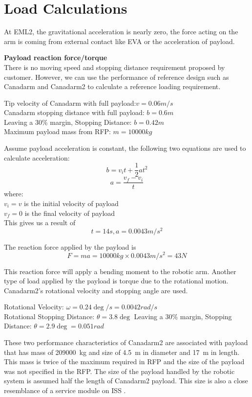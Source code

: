 \section{Load Calculations}
\label{app:loadcalc}
\setcounter{equation}{0}
At EML2, the gravitational acceleration is nearly zero, the force acting on the arm is coming from external contact like EVA or the acceleration of payload.

\large \textbf{Payload reaction force/torque}\\
\normalsize There is no moving speed and stopping distance requirement proposed by customer. However, we can use the performance of reference design such as Canadarm and Canadarm2 to calculate a reference loading requirement. 

Tip velocity of Canadarm with full payload:$v=0.06m/s$\\
Canadarm stopping distance with full payload: $b=0.6m$\\
Leaving a 30\% margin, Stopping Distance: $b=0.42m$\\
Maximum payload mass from RFP: $m=10000kg$

Assume payload acceleration is constant, the following two equations are used to calculate acceleration:
\begin{equation}
b=v_it+\frac{1}{2}at^2
\end{equation}
\begin{equation}
a=\frac{v_f-v_i}{t}
\end{equation}
where:\\
$v_i=v$ is the initial velocity of payload\\
$v_f=0$ is the final velocity of payload\\
This gives us a result of $$t=14s, a=0.0043m/s^2$$

The reaction force applied by the payload is 
$$F=ma=10000kg\times0.0043m/s^2=43N$$

This reaction force will apply a bending moment to the robotic arm. Another type of load applied by the payload is torque due to the rotational motion. Canadarm2's rotational velocity and stopping angle are used. 

Rotational Velocity: $\omega=0.24\deg/s=0.0042rad/s$ \cite{NASAsysreq_Kumar}\\
Rotational Stopping Distance: $\theta=3.8\deg$
Leaving a 30\% margin, Stopping Distance: $\theta=2.9\deg=0.051rad$

These two performance characteristics of Canadarm2 are associated with payload that has mass of \SI{209000}{\kilo\gram} and size of \SI{4.5}{\metre} in diameter and \SI{17}{\metre} in length. This mass is twice of the maximum required in RFP and the size of the payload was not specified in the RFP. The size of the payload handled by the robotic system is assumed half the length of Canadarm2 payload. This size is also a close resemblance of a service module on ISS \cite{ISS_Harmony}.

